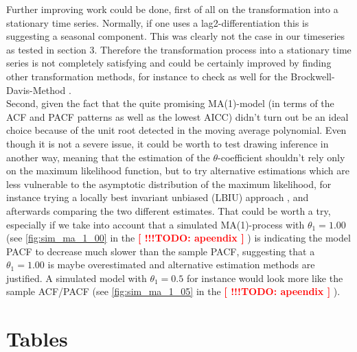 \documentclass[11pt,a4paper]{article}
\newcommand{\TODO}[1]{%
    \textcolor{red}{ %
        \textbf{[ !!!TODO: #1 ]}%
    }%
    \PackageWarning{TODO:}{TODO: #1}%
}
\begin{document}
Further improving work could be done, first of all on the transformation into a stationary time series. Normally, if one uses a lag2-differentiation this is suggesting a seasonal component. This was clearly not the case in our timeseries as tested in section 3. Therefore the transformation process into a stationary time series is not completely satisfying and could be certainly improved by finding other transformation methods, for instance to check as well for the Brockwell-Davis-Method \citep{bd02}. \\

Second, given the fact that the quite promising MA(1)-model (in terms of the ACF and PACF patterns as well as the lowest AICC) didn't turn out be an ideal choice because of the unit root detected in the moving average polynomial. Even though it is not a severe issue, it could be worth to test drawing inference in another way, meaning that the estimation of the $\theta$-coefficient shouldn't rely only on the maximum likelihood function, but to try alternative estimations which are less vulnerable to the asymptotic distribution of the maximum likelihood, for instance trying a locally best invariant unbiased (LBIU) approach \cite{davissong11}, and afterwards comparing the two different estimates. That could be worth a try, especially if we take into account that a simulated MA(1)-process with $\theta_1 = 1.00 $ (see \cref{fig:sim_ma_1_00} in the  \TODO{apeendix}) is indicating the model PACF to decrease much slower than the sample PACF, suggesting that a $\theta_1 = 1.00 $ is maybe overestimated and alternative estimation methods are justified. A simulated model with $\theta_1 = 0.5 $ for instance would look more like the sample ACF/PACF (see \cref{fig:sim_ma_1_05} in the \TODO{apeendix}).

\pagebreak




\pagebreak


\appendix


\section{Tables}
\end{document}
